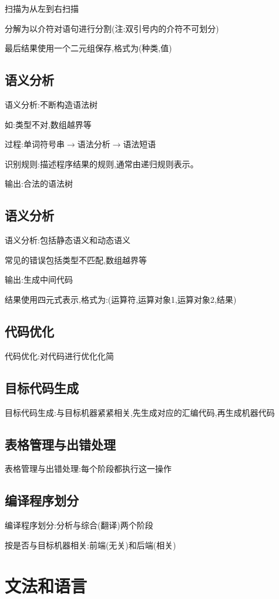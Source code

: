     扫描为从左到右扫描

    分解为以介符对语句进行分割(注:双引号内的介符不可划分)

    最后结果使用一个二元组保存,格式为(种类,值)

    \subsection{语义分析}
    语义分析:不断构造语法树

    如:类型不对,数组越界等

    过程:单词符号串$\to$语法分析$\to$语法短语

    识别规则:描述程序结果的规则,通常由递归规则表示。

    输出:合法的语法树

    \subsection{语义分析}
    语义分析:包括静态语义和动态语义

    常见的错误包括类型不匹配,数组越界等

    输出:生成中间代码

    结果使用四元式表示,格式为:(运算符,运算对象1,运算对象2,结果)

    \subsection{代码优化}
    代码优化:对代码进行优化化简

    \subsection{目标代码生成}
    目标代码生成:与目标机器紧紧相关,先生成对应的汇编代码,再生成机器代码

    \subsection{表格管理与出错处理}
    表格管理与出错处理:每个阶段都执行这一操作

    \subsection{编译程序划分}
    编译程序划分:分析与综合(翻译)两个阶段

    按是否与目标机器相关:前端(无关)和后端(相关)

  \section{文法和语言}


